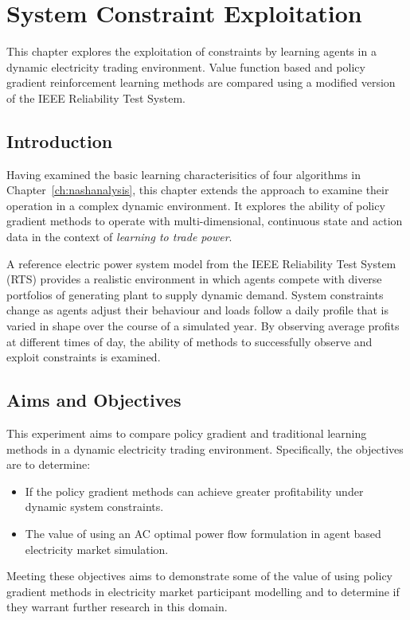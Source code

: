 \chapter{System Constraint Exploitation}
\label{ch:exploitation}
This chapter explores the exploitation of constraints by learning agents in a
dynamic electricity trading environment.  Value function based and policy
gradient reinforcement learning methods are compared using a modified version
of the IEEE Reliability Test System.

\section{Introduction}
Having examined the basic learning characterisitics of four algorithms in
Chapter~\ref{ch:nashanalysis}, this chapter extends the approach to examine
their operation in a complex dynamic environment.  It explores the ability of
policy gradient methods to operate with multi-dimensional, continuous state and
action data in the context of \textit{learning to trade power}.

A reference electric power system model from the IEEE Reliability Test System
(RTS) \cite{ieee79rts} provides a realistic environment in which agents compete
with diverse portfolios of generating plant to supply dynamic demand.  System
constraints change as agents adjust their behaviour and loads follow a daily
profile that is varied in shape over the course of a simulated year.  By
observing average profits at different times of day, the ability of methods to
successfully observe and exploit constraints is examined.

\section{Aims and Objectives}
This experiment aims to compare policy gradient and traditional learning methods
in a dynamic electricity trading environment.  Specifically, the objectives are
to determine:
\begin{itemize}
  \item If the policy gradient methods can achieve greater profitability
  under dynamic system constraints.
  \item The value of using an AC optimal power flow formulation in agent based
  electricity market simulation.
\end{itemize}
Meeting these objectives aims to demonstrate some of the value of using policy
gradient methods in electricity market participant modelling and to determine
if they warrant further research in this domain.

